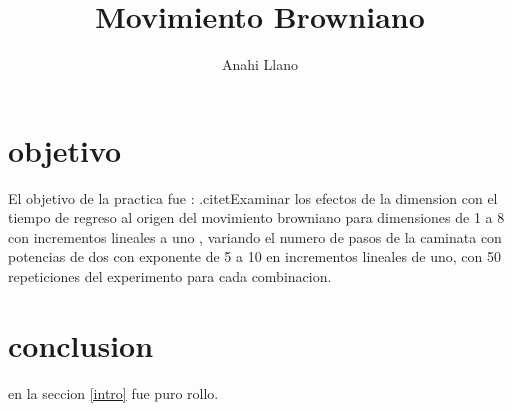 \documentclass{article}
\title {Movimiento Browniano}
\author{Anahi Llano}
\begin{document}
\maketitle

\section{objetivo}\label{obj}

El objetivo de la practica fue : .citet\elis Examinar los efectos de la dimension con el tiempo de regreso al origen del movimiento browniano para dimensiones de 1 a 8 con incrementos lineales a uno , variando el numero de pasos de la caminata con potencias de dos con exponente de 5 a 10 en incrementos lineales de uno, con 50 repeticiones del experimento para cada combinacion.

\section{conclusion}

en la seccion \ref{intro} fue puro rollo.



\end{document}

